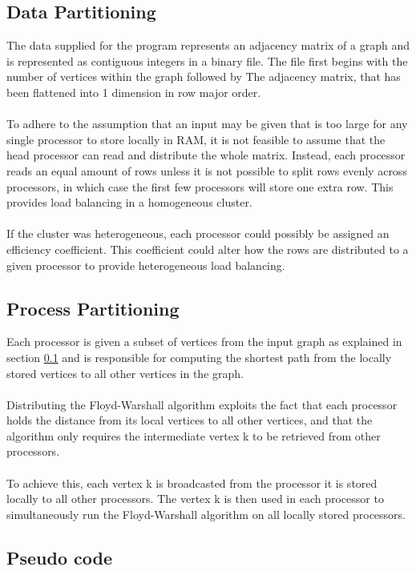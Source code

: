 \documentclass[12pt]{article}
\begin{document}
\subsection{Data Partitioning}
\label{sec:data}
The data supplied for the program represents an adjacency matrix of a graph and is represented as contiguous integers in a binary file. The file first begins with the number of vertices within the graph followed by The adjacency matrix, that has been flattened into 1 dimension in row major order.
\\\\
To adhere to the assumption that an input may be given that is too large for any single processor to store locally in RAM, it is not feasible to assume that the head processor can read and distribute the whole matrix. Instead, each processor reads an equal amount of rows unless it is not possible to split rows evenly across processors, in which case the first few processors will store one extra row. This provides load balancing in a homogeneous cluster. 
\\\\ 
If the cluster was heterogeneous, each processor could possibly be assigned an efficiency coefficient. This coefficient could alter how the rows are distributed to a given processor to provide heterogeneous load balancing.


\subsection{Process Partitioning}
Each processor is given a subset of vertices from the input graph as explained in section \ref{sec:data} and is responsible for computing the shortest path from the locally stored vertices to all other vertices in the graph. 
\\\\
Distributing the Floyd-Warshall algorithm exploits the fact that each processor holds the distance from its local vertices to all other vertices, and that the algorithm only requires the intermediate vertex k to be retrieved from other processors.
\\\\
To achieve this, each vertex k is broadcasted from the processor it is stored locally to all other processors. The vertex k is then used in each processor to simultaneously run the Floyd-Warshall algorithm on all locally stored processors.

\subsection{Pseudo code}
\label{sec:dist_code}
\end{document}
